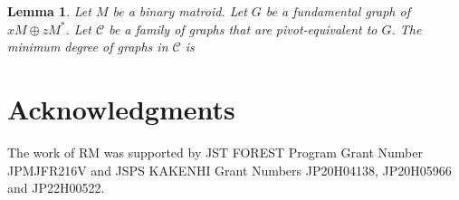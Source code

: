 \documentclass[twoside,10pt]{article}
\newtheorem{lemma}[theorem]{Lemma}
\theoremstyle{definition}
\theoremstyle{remark}
\begin{document}
\begin{lemma}
Let $M$ be a binary matroid.
Let $G$ be a fundamental graph of $xM\oplus zM^*$.
Let $\mathcal{C}$ be a family of graphs that are pivot-equivalent to $G$.
The minimum degree of graphs in $\mathcal{C}$ is 
\end{lemma}

\section*{Acknowledgments}
The work of RM was supported by JST FOREST Program Grant Number JPMJFR216V and JSPS KAKENHI Grant Numbers JP20H04138, JP20H05966 and JP22H00522.




\end{document}
